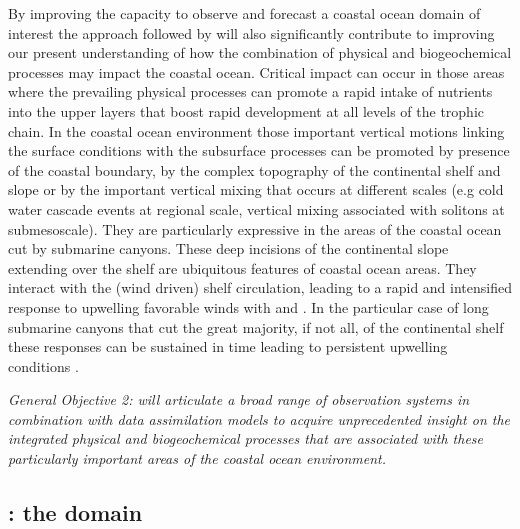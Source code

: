 By improving the capacity to observe and forecast a coastal ocean
domain of interest the approach followed by \proj will also
significantly contribute to improving our present understanding of how
the combination of physical and biogeochemical processes may impact
the coastal ocean. Critical impact can occur in those areas where the
prevailing physical processes can promote a rapid intake of nutrients
into the upper layers that boost rapid development at all levels of
the trophic chain. In the coastal ocean environment those important
vertical motions linking the surface conditions with the subsurface
processes can be promoted by presence of the coastal boundary, by the
complex topography of the continental shelf and slope or by the
important vertical mixing that occurs at different scales (e.g cold
water cascade events at regional scale, vertical mixing associated
with solitons at submesoscale). They are particularly expressive in
the areas of the coastal ocean cut by submarine canyons. These deep
incisions of the continental slope extending over the shelf are
ubiquitous features of coastal ocean areas. They interact with the
(wind driven) shelf circulation, leading to a rapid and intensified
response to upwelling favorable winds with and . In the particular case of long submarine canyons that cut the
great majority, if not all, of the continental shelf these responses
can be sustained in time leading to persistent upwelling conditions
.
 
\emph{General Objective 2: \proj will articulate a broad range of
  observation systems in combination with data assimilation models to
  acquire unprecedented insight on the integrated physical and
  biogeochemical processes that are associated with these particularly
  important areas of the coastal ocean environment.}

\subsection{\naze: the domain}


